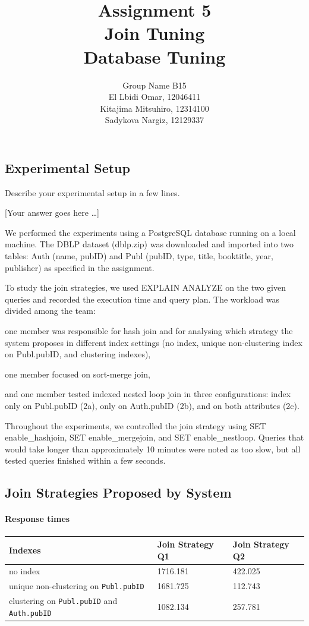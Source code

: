 \documentclass[11pt]{scrartcl}
\title{
  \textbf{\large Assignment 5} \\
  Join Tuning \\
  {\large Database Tuning}}
\author{
  Group Name B15 \\
  \large El Lbidi Omar, 12046411 \\
  \large Kitajima Mitsuhiro, 12314100 \\
  \large Sadykova Nargiz, 12129337
}
\newcommand{\youranswerhere}{[Your answer goes here \ldots]}
\begin{document}
\maketitle

\subsection*{Experimental Setup}

Describe your experimental setup in a few lines.

\youranswerhere{We performed the experiments using a PostgreSQL database running on a local machine. The DBLP dataset (dblp.zip) was downloaded and imported into two tables: Auth (name, pubID) and Publ (pubID, type, title, booktitle, year, publisher) as specified in the assignment.

To study the join strategies, we used EXPLAIN ANALYZE on the two given queries and recorded the execution time and query plan. The workload was divided among the team:

one member was responsible for hash join and for analysing which strategy the system proposes in different index settings (no index, unique non-clustering index on Publ.pubID, and clustering indexes),

one member focused on sort-merge join,

and one member tested indexed nested loop join in three configurations: index only on Publ.pubID (2a), only on Auth.pubID (2b), and on both attributes (2c).

Throughout the experiments, we controlled the join strategy using SET enable_hashjoin, SET enable_mergejoin, and SET enable_nestloop. Queries that would take longer than approximately 10 minutes were noted as too slow, but all tested queries finished within a few seconds.}

\subsection*{Join Strategies Proposed by System}

\paragraph{Response times}\mbox{}

\begin{table}[H]
  \centering
  \begin{tabular}{l|l|l}
    Indexes & Join Strategy Q1 & Join Strategy Q2 \tabularnewline
    \hline
    no index & 1716.181 & 422.025 \tabularnewline
    unique non-clustering on \texttt{Publ.pubID} & 1681.725 & 112.743
      \tabularnewline
    clustering on \texttt{Publ.pubID} and \texttt{Auth.pubID} & 1082.134 & 257.781
      \tabularnewline
  \end{tabular}
\end{table}
\end{document}
